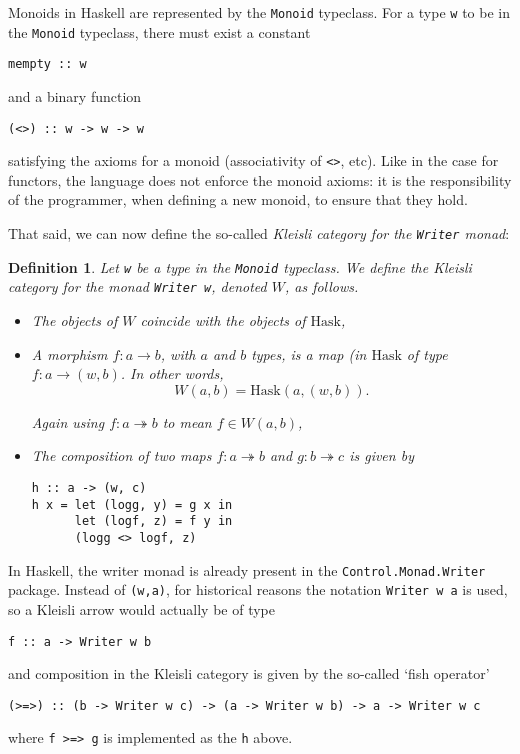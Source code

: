 \documentclass[11pt]{article}
\newtheorem{definition}{Definition}
\theoremstyle{nonumberplain}
\newcommand{\Hask}{\mathrm{Hask}}
\newcommand*\lsin{\lstinline}
\begin{document}
Monoids in Haskell are represented by the \lsin|Monoid| typeclass. For a type \lsin|w| to be in the \lsin|Monoid| typeclass, there must exist a constant
\begin{lstlisting}
mempty :: w
\end{lstlisting}
and a binary function
\begin{lstlisting}
(<>) :: w -> w -> w
\end{lstlisting}
satisfying the axioms for a monoid (associativity of \lsin|<>|, etc). Like in the case for functors, the language does not enforce the monoid axioms: it is the responsibility of the programmer, when defining a new monoid, to ensure that they hold.

That said, we can now define the so-called \emph{Kleisli category for the \lsin|Writer| monad}:

\begin{definition}
Let \lsin|w| be a type in the \lsin|Monoid| typeclass. We define \emph{the Kleisli category for the monad \lsin|Writer w|}, denoted $W$, as follows.
\begin{itemize}
\item The objects of $W$ coincide with the objects of $\Hask$,
\item A morphism $f \colon a \to b$, with $a$ and $b$ types, is a map (in $\Hask$ of type $f \colon a \to (w, b)$. In other words,
\begin{equation}
W(a,b) = \Hask(a, (w,b)).
\end{equation}

Again using $f \colon a \twoheadrightarrow b$ to mean $f \in W(a,b)$,
\item The composition of two maps $f \colon a \twoheadrightarrow b$ and $g \colon b \twoheadrightarrow c$ is given by
\begin{lstlisting}
h :: a -> (w, c)
h x = let (logg, y) = g x in
      let (logf, z) = f y in
      (logg <> logf, z)
\end{lstlisting}
\end{itemize}
\end{definition}

In Haskell, the writer monad is already present in the \lsin|Control.Monad.Writer| package. Instead of \lsin|(w,a)|, for historical reasons the notation \lsin|Writer w a| is used, so a Kleisli arrow would actually be of type
\begin{lstlisting}
f :: a -> Writer w b
\end{lstlisting} 
and composition in the Kleisli category is given by the so-called `fish operator'
\begin{lstlisting}
(>=>) :: (b -> Writer w c) -> (a -> Writer w b) -> a -> Writer w c
\end{lstlisting}
where \lsin|f >=> g| is implemented as the \lsin|h| above.
\end{document}
